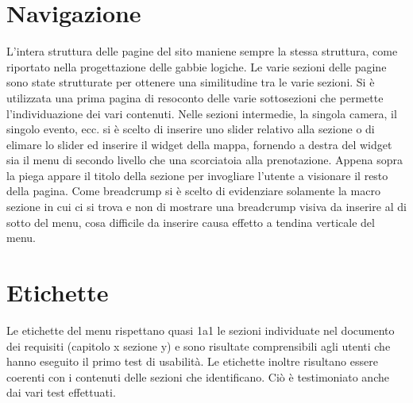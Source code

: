 \documentclass[a4paper,12pt,hidelinks]{report}
\begin{document}
\section*{Navigazione}
L'intera struttura delle pagine del sito maniene sempre la stessa struttura, come riportato nella progettazione delle gabbie logiche.
Le varie sezioni delle pagine sono state strutturate per ottenere una similitudine tra le varie sezioni. Si è utilizzata una prima pagina di resoconto delle varie sottosezioni
che permette l'individuazione dei vari contenuti. Nelle sezioni intermedie, la singola camera, il singolo evento, ecc. si è scelto di inserire uno slider relativo alla sezione
o di elimare lo slider ed inserire il widget della mappa, fornendo a destra del widget sia il menu di secondo livello che una scorciatoia alla prenotazione. Appena sopra la piega
appare il titolo della sezione per invogliare l'utente a visionare il resto della pagina. Come breadcrump si è scelto di evidenziare solamente la macro sezione in cui ci si trova
e non di mostrare una breadcrump visiva da inserire al di sotto del menu, cosa difficile da inserire causa effetto a tendina verticale del menu.

\section*{Etichette}
Le etichette del menu rispettano quasi 1a1 le sezioni individuate nel documento dei requisiti (capitolo x sezione y) e sono risultate comprensibili agli utenti che hanno eseguito
il primo test di usabilità.
Le etichette inoltre risultano essere coerenti con i contenuti delle sezioni che identificano. 
Ciò è testimoniato anche dai vari test effettuati.
\end{document}
